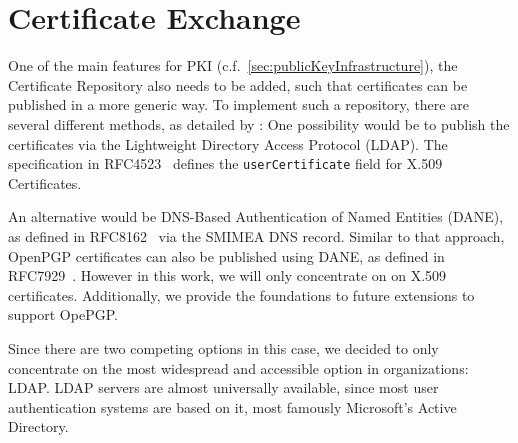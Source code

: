 \section{Certificate Exchange}\label{sec:certificateExchange}
One of the main features for PKI (c.f.~\ref{sec:publicKeyInfrastructure}), the Certificate Repository also needs to be
added, such that certificates can be published in a more generic way.
To implement such a repository, there are several different methods, as detailed by
\citet{hauner2016interoperability}:
One possibility would be to publish the certificates via the Lightweight Directory Access Protocol (LDAP).
The specification in RFC4523~\cite{RFC4523} defines the \lstinline{userCertificate} field for X.509 Certificates.

An alternative would be DNS-Based Authentication of Named Entities (DANE), as defined in RFC8162~\cite{RFC8162} via the
SMIMEA DNS record.
Similar to that approach, OpenPGP certificates can also be published using DANE, as defined in RFC7929~\cite{RFC7929}.
However in this work, we will only concentrate on on X.509 certificates.
Additionally, we provide the foundations to future extensions to support OpePGP\@.

Since there are two competing options in this case, we decided to only concentrate on the most widespread and accessible
option in organizations: LDAP\@.
LDAP servers are almost universally available, since most user authentication systems are based on it, most famously
Microsoft's Active Directory.
